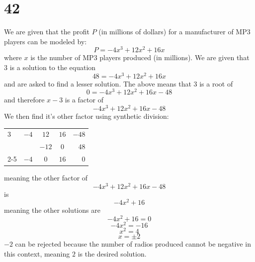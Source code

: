 \documentclass{article}
\theoremstyle{definition}
\begin{document}
\section*{42}
We are given that the profit $P$ (in millions of dollars) for a manufacturer of MP3 players can be modeled by:
\[ P=-4x^3+12x^2+16x \] where $x$ is the number of MP3 players produced (in millions). We are given that $3$ is a solution to the equation 
\[ 48=-4x^3+12x^2+16x \] and are asked to find a lesser solution. The above means that $3$ is a root of
\[ 0=-4x^3+12x^2+16x-48 \] and therefore $x-3$ is a factor of \[ -4x^3+12x^2+16x-48 \] We then find it's other factor using synthetic division:
\FloatBarrier
	\begin{center}
		\begin{tabular}{l|cccr}
			$3$ & $-4$ & $12$ & $16$ & $-48$ \\
			& & $-12$ & $0 $ & $48$ \\[-4.75pt]
			\cmidrule{2-5}
			& $-4$ & $0$ & $16$ & $0$
		\end{tabular}
	\end{center}
\FloatBarrier
meaning the other factor of 
\[ -4x^3+12x^2+16x-48 \] is \[ -4x^2+16 \] meaning the other solutions are \[ -4x^2+16=0 \] \[ -4x^2=-16\] \[ x^2=4 \] \[ x=\pm 2 \]
$-2$ can be rejected because the number of radios produced cannot be negative in this context, meaning $2$ is the desired solution.\newline
\end{document}
